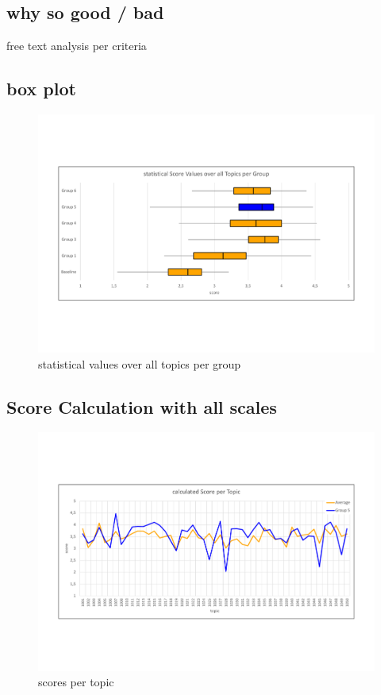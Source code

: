 \subsection{why so good / bad}
free text analysis per criteria


\subsection{box plot}

\begin{figure}[H]
	\centering
	\includegraphics[trim= 0 150 0 150,width=\textwidth]{img/box.pdf}
	\caption{statistical values over all topics per group}
	\label{fig:svg}
\end{figure}


\subsection{Score Calculation with all scales}

\begin{figure}[H]
	\centering
	\includegraphics[trim= 0 150 0 150,width=\textwidth]{img/score_per_topic.pdf}
	\caption{scores per topic}
	\label{fig:spt}
\end{figure}


